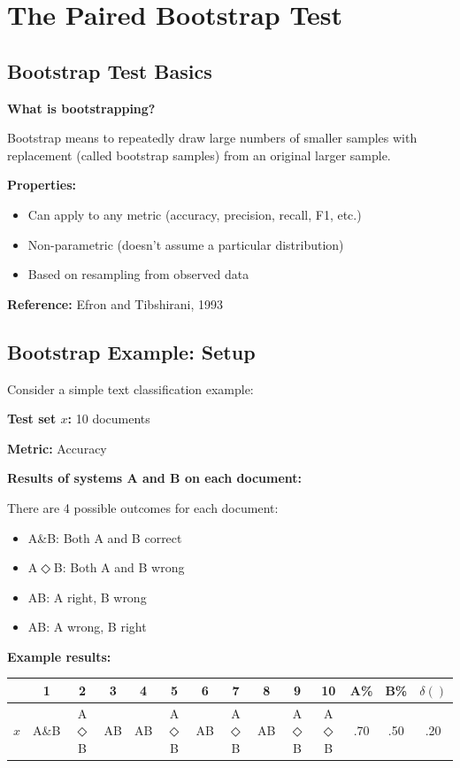 \documentclass[11pt,a4paper]{article}
\theoremstyle{definition}
\theoremstyle{plain}
\theoremstyle{remark}
\begin{document}
\section{The Paired Bootstrap Test}

\subsection{Bootstrap Test Basics}

\textbf{What is bootstrapping?}

Bootstrap means to repeatedly draw large numbers of smaller samples with replacement (called bootstrap samples) from an original larger sample.

\textbf{Properties:}
\begin{itemize}
    \item Can apply to any metric (accuracy, precision, recall, F1, etc.)
    \item Non-parametric (doesn't assume a particular distribution)
    \item Based on resampling from observed data
\end{itemize}

\textbf{Reference:} Efron and Tibshirani, 1993

\subsection{Bootstrap Example: Setup}

Consider a simple text classification example:

\textbf{Test set $x$:} 10 documents

\textbf{Metric:} Accuracy

\textbf{Results of systems A and B on each document:}

There are 4 possible outcomes for each document:
\begin{itemize}
    \item A\&B: Both A and B correct
    \item A$\Diamond$B: Both A and B wrong
    \item AB: A right, B wrong
    \item AB: A wrong, B right
\end{itemize}

\textbf{Example results:}

\begin{center}
\begin{tabular}{|c|c|c|c|c|c|c|c|c|c|c|c|c|c|}
\hline
 & 1 & 2 & 3 & 4 & 5 & 6 & 7 & 8 & 9 & 10 & A\% & B\% & $\delta()$ \\
\hline
$x$ & A\&B & A$\Diamond$B & AB & AB & A$\Diamond$B & AB & A$\Diamond$B & AB & A$\Diamond$B & A$\Diamond$B & .70 & .50 & .20 \\
\hline
\end{tabular}
\end{center}
\end{document}
